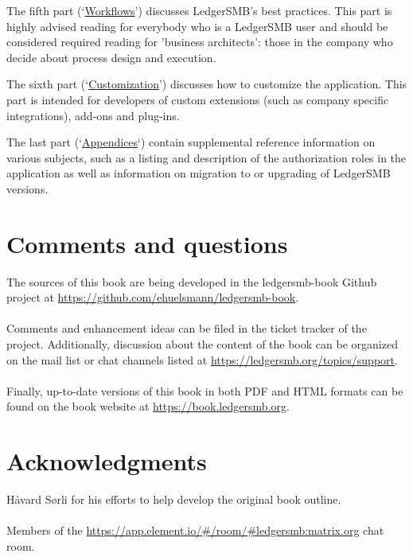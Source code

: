 \documentclass[10pt,a4paper]{book}
\begin{document}
The fifth part (\lq\hyperref[part-workflows]{Workflows}\rq) discusses LedgerSMB's best practices. 
This part is highly advised
reading for everybody who is a LedgerSMB user and should be considered required reading for 'business
architects': those in the company who decide about process design and execution.

The sixth part (\lq\hyperref[part-customization]{Customization}\rq) discusses how to customize the application. 
This part is intended for developers of
custom extensions (such as company specific integrations), add-ons and plug-ins.

The last part (\lq\hyperref[part-appendices]{Appendices}\lq) contain supplemental reference information on various subjects, 
such as a listing and description
of the authorization roles in the application as well as information on migration to or upgrading of
LedgerSMB versions.


\section*{Comments and questions}
\label{sec-comments}

The sources of this book are being developed in the ledgersmb-book Github project at
\url{https://github.com/ehuelsmann/ledgersmb-book}. \\
~ \\
Comments and enhancement ideas can be filed
in the ticket tracker of the project. Additionally, discussion about the content of the book
can be organized on the mail list or chat channels listed  at \url{https://ledgersmb.org/topics/support}.\\
~ \\
Finally, up-to-date versions of this book in both PDF and HTML formats can be found on the book website at \url{https://book.ledgersmb.org}.


\section*{Acknowledgments}
\label{sec-acknowledgements}

H{\aa}vard S{\o}rli for his efforts to help develop the original book outline.\\
~ \\
Members of the \url{https://app.element.io/#/room/#ledgersmb:matrix.org}  chat room.









\printindex
\end{document}
